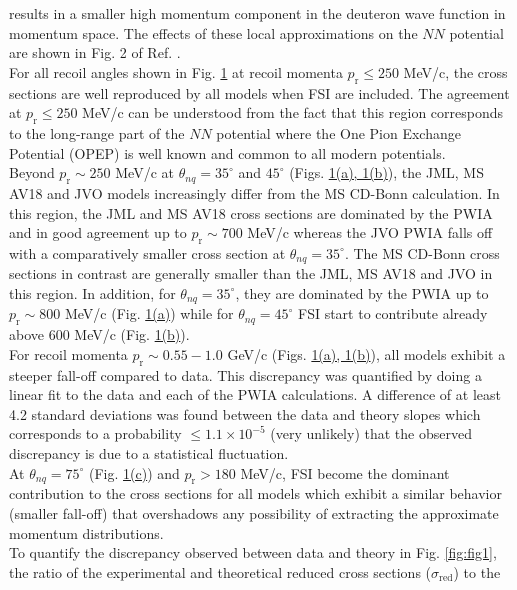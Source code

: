 \documentclass[aps,prl,twocolumn,showpacs,superscriptaddress,groupedaddress]{revtex4-2}  %
\begin{document}
results in a smaller high momentum component in the deuteron wave function in momentum space.
The effects of these local approximations on the $NN$ potential are shown in Fig. 2 of Ref. \cite{PhysRevC.63.024001}.\\
\indent For all recoil angles shown in Fig. \hyperref[fig:fig1]{1} at recoil momenta $p_{\mathrm{r}}\leq250$ MeV/c, the cross sections are well reproduced by all models when FSI are included.
The agreement at $p_{\mathrm{r}}\leq250$ MeV/c can be understood from the fact that this region corresponds to the long-range part of the $NN$ potential where the One Pion Exchange Potential (OPEP)
is well known and common to all modern potentials. \\
\indent Beyond $p_{\mathrm{r}}\sim250$ MeV/c at $\theta_{nq}=35^{\circ}$ and $45^{\circ}$ (Figs. \hyperref[fig:fig1]{1(a), 1(b)}), the JML,
MS AV18 and JVO models increasingly differ from the MS CD-Bonn calculation. In this region, the JML and MS AV18 cross sections are dominated by the PWIA and in good agreement up to $p_{\mathrm{r}}\sim700$ MeV/c whereas
the JVO PWIA falls off with a comparatively smaller cross section at $\theta_{nq}=35^{\circ}$. The MS CD-Bonn cross sections in contrast are generally smaller than the JML, MS AV18 and JVO in this region.
In addition, for $\theta_{nq}=35^{\circ}$, they are dominated by the PWIA up to $p_{\mathrm{r}}\sim800$ MeV/c
(Fig. \hyperref[fig:fig1]{1(a)}) while for $\theta_{nq}=45^{\circ}$ FSI start to contribute already above 600 MeV/c (Fig. \hyperref[fig:fig1]{1(b)}).\\
\indent For recoil momenta $p_{\mathrm{r}} \sim 0.55-1.0$ GeV/c (Figs. \hyperref[fig:fig1]{1(a), 1(b)}), all models exhibit a
steeper fall-off compared to data. This discrepancy was quantified by doing a linear fit to the data and each of the PWIA calculations. A difference of at least
4.2 standard deviations was found between the data and theory slopes which corresponds to a probability $\leq 1.1\times 10^{-5}$ (very unlikely) that the observed discrepancy is due to a statistical fluctuation. \\ 
\indent At $\theta_{nq}=75^{\circ}$ (Fig. \hyperref[fig:fig1]{1(c)}) and $p_{\mathrm{r}}>180$ MeV/c, FSI become the dominant contribution to the cross sections for all models which exhibit a similar
behavior (smaller fall-off) that overshadows any possibility of extracting the approximate momentum distributions.\\
\indent To quantify the discrepancy observed between data and theory in Fig. \ref{fig:fig1}, the ratio of the experimental and theoretical reduced cross sections ($\sigma_{\mathrm{red}}$) to the
\end{document}
